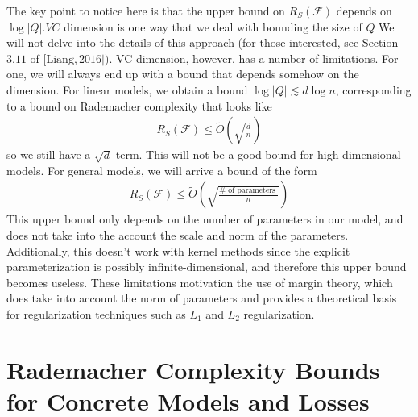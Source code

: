\documentclass{article}
\begin{document}
The key point to notice here is that the upper bound on $R_{S}(\mathcal{F})$ depends on $\log |Q| . V C$ dimension is one way that we deal with bounding the size of $Q$ We will not delve into the details of this approach (for those interested, see Section $3.11$ of $[\mathrm{Liang}, 2016 \mid) .$ VC dimension, however, has a number of limitations. For one, we will always end up with a bound that depends somehow on the dimension. For linear models, we obtain a bound $\log |Q| \lesssim d \log n$, corresponding to a bound on Rademacher complexity that looks like
\begin{align*}
R_{S}(\mathcal{F}) \leq \widetilde{O}\left(\sqrt{\frac{d}{n}}\right)
\end{align*}
so we still have a $\sqrt{d}$ term. This will not be a good bound for high-dimensional models. For general models, we will arrive a bound of the form
\begin{align*}
R_{S}(\mathcal{F}) \leq \widetilde{O}\left(\sqrt{\frac{\# \text { of parameters }}{n}}\right)
\end{align*}
This upper bound only depends on the number of parameters in our model, and does not take into the account the scale and norm of the parameters. Additionally, this doesn't work with kernel methods since the explicit parameterization is possibly infinite-dimensional, and therefore this upper bound becomes useless.
These limitations motivation the use of margin theory, which does take into account the norm of parameters and provides a theoretical basis for regularization techniques such as $L_{1}$ and $L_{2}$ regularization.

\section{Rademacher Complexity Bounds for Concrete Models and Losses}\label{sec:radcom_conc}


\end{document}
